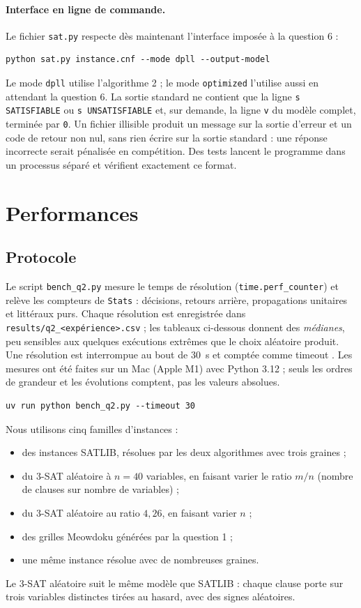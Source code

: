 \documentclass[11pt,a4paper]{article}
\begin{document}
\paragraph{Interface en ligne de commande.} Le fichier \texttt{sat.py}
respecte dès maintenant l'interface imposée à la question 6 :
\begin{lstlisting}
python sat.py instance.cnf --mode dpll --output-model
\end{lstlisting}
Le mode \texttt{dpll} utilise l'algorithme 2 ; le mode \texttt{optimized}
l'utilise aussi en attendant la question 6. La sortie standard ne contient
que la ligne \texttt{s SATISFIABLE} ou \texttt{s UNSATISFIABLE} et, sur
demande, la ligne \texttt{v} du modèle complet, terminée par \texttt{0}. Un
fichier illisible produit un message sur la sortie d'erreur et un code de
retour non nul, sans rien écrire sur la sortie standard : une réponse
incorrecte serait pénalisée en compétition. Des tests lancent le programme
dans un processus séparé et vérifient exactement ce format.

\section{Performances}

\subsection{Protocole}

Le script \texttt{bench\_q2.py} mesure le temps de résolution
(\texttt{time.perf\_counter}) et relève les compteurs de \texttt{Stats} :
décisions, retours arrière, propagations unitaires et littéraux purs. Chaque
résolution est enregistrée dans \texttt{results/q2\_<expérience>.csv} ;
les tableaux ci-dessous donnent des \emph{médianes}, peu sensibles aux
quelques exécutions extrêmes que le choix aléatoire produit. Une résolution
est interrompue au bout de 30~s et comptée comme \og timeout \fg{}. Les
mesures ont été faites sur un Mac (Apple M1) avec Python 3.12 ; seuls les
ordres de grandeur et les évolutions comptent, pas les valeurs absolues.
\begin{lstlisting}
uv run python bench_q2.py --timeout 30
\end{lstlisting}

Nous utilisons cinq familles d'instances :
\begin{itemize}
  \item des instances SATLIB, résolues par les deux algorithmes avec trois
    graines ;
  \item du 3-SAT aléatoire à $n=40$ variables, en faisant varier le ratio
    $m/n$ (nombre de clauses sur nombre de variables) ;
  \item du 3-SAT aléatoire au ratio $4{,}26$, en faisant varier $n$ ;
  \item des grilles Meowdoku générées par la question 1 ;
  \item une même instance résolue avec de nombreuses graines.
\end{itemize}
Le 3-SAT aléatoire suit le même modèle que SATLIB : chaque clause porte sur
trois variables distinctes tirées au hasard, avec des signes aléatoires.
\end{document}
